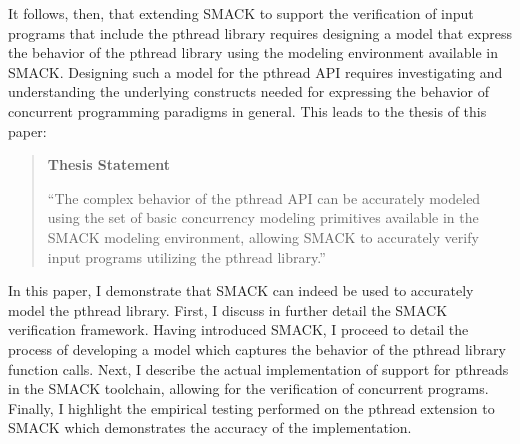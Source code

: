 It follows, then, that extending SMACK to support the verification of
input programs that include the pthread library requires designing a
model that express the behavior of the pthread library using the
modeling environment available in SMACK.  Designing such a model for
the pthread API requires investigating and understanding the
underlying constructs needed for expressing the behavior of concurrent
programming paradigms in general.  This leads to the thesis of this
paper:

\begin{quote}
\begin{center}
\textbf{Thesis Statement}
\end{center}
``The complex behavior of the pthread
API can be accurately modeled using the set of basic concurrency
modeling primitives available in the SMACK modeling environment,
allowing SMACK to accurately verify input programs utilizing the
pthread library.''
\end{quote}

In this paper, I demonstrate that SMACK can indeed be used to
accurately model the pthread library.  First, I discuss in further
detail the SMACK verification framework.  Having introduced SMACK, I
proceed to detail the process of developing a model which captures the
behavior of the pthread library function calls. Next, I describe the
actual implementation of support for pthreads in the SMACK toolchain,
allowing for the verification of concurrent programs.  Finally, I
highlight the empirical testing performed on the pthread extension to
SMACK which demonstrates the accuracy of the implementation. 

